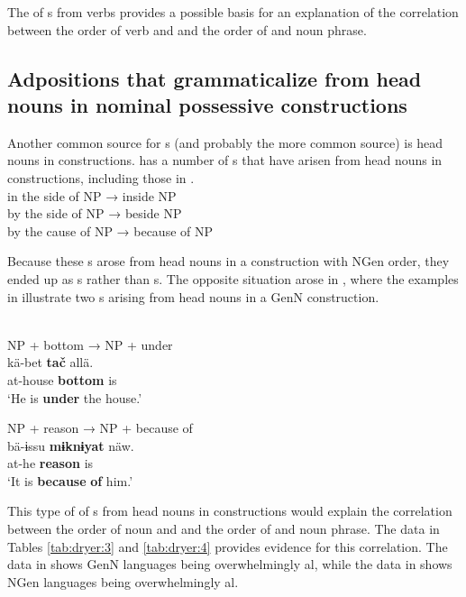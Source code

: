 \documentclass[output=paper]{langsci/langscibook}
\begin{document}
\noindent The  of s from verbs provides a possible basis for an explanation of the correlation between the order of verb and  and the order of  and noun phrase.

\subsection{Adpositions that grammaticalize from head nouns in nominal possessive constructions}\label{sec:dryer:2.2}

Another common  source for s (and probably the more common source) is head nouns in  constructions.  has a number of s that have arisen from head nouns in  constructions, including those in .
\newpage
\ea\label{ex:dryer:8}
{}\\
\ea in the side of NP → inside NP\\
\ex by the side of NP → beside NP\\
\ex by the cause of NP → because of NP\\
\z
\z

\noindent Because these s arose from head nouns in a  construction with NGen order, they ended up as s rather than s. The opposite situation arose in , where the examples in  illustrate two s arising from head nouns in a GenN construction.

\ea\label{ex:dryer:9}
 \\
\ea
NP + bottom → NP + under\\

\gll   kä-bet    \textbf{tač}    allä.\\
       at-house  \textbf{bottom}  is\\
\glt   ‘He is \textbf{under} the house.’

\ex  NP + reason → NP + because of\\

\gll   bä-ɨssu  \textbf{mɨknɨyat}  näw.\\
       at-he    \textbf{reason}  is\\
\glt   ‘It is \textbf{because} \textbf{of} him.’
\z
\z

This type of  of s from head nouns in  constructions would explain the correlation between the order of noun and  and the order of  and noun phrase. The data in Tables \ref{tab:dryer:3} and \ref{tab:dryer:4} provides evidence for this correlation. The data in  shows GenN languages being overwhelmingly al, while the data in  shows NGen languages being overwhelmingly al.
\end{document}
